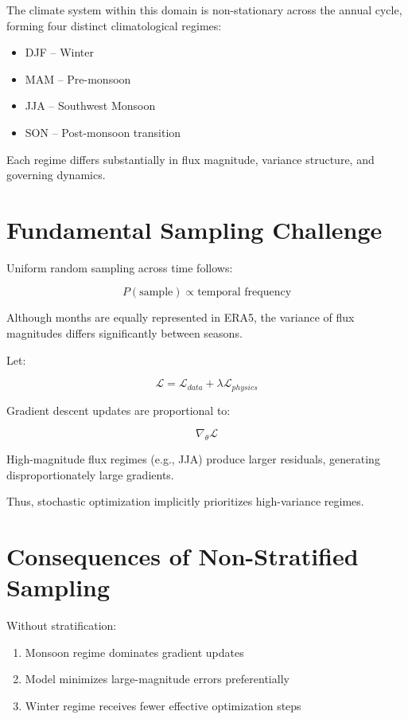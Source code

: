 \documentclass[12pt]{article}
\begin{document}
The climate system within this domain is non-stationary across the annual cycle, forming four distinct climatological regimes:

\begin{itemize}
    \item DJF – Winter
    \item MAM – Pre-monsoon
    \item JJA – Southwest Monsoon
    \item SON – Post-monsoon transition
\end{itemize}

Each regime differs substantially in flux magnitude, variance structure, and governing dynamics.

\section{Fundamental Sampling Challenge}

Uniform random sampling across time follows:

\[
P(\text{sample}) \propto \text{temporal frequency}
\]

Although months are equally represented in ERA5, the variance of flux magnitudes differs significantly between seasons.

Let:

\[
\mathcal{L} = \mathcal{L}_{data} + \lambda \mathcal{L}_{physics}
\]

Gradient descent updates are proportional to:

\[
\nabla_\theta \mathcal{L}
\]

High-magnitude flux regimes (e.g., JJA) produce larger residuals, generating disproportionately large gradients.

Thus, stochastic optimization implicitly prioritizes high-variance regimes.

\section{Consequences of Non-Stratified Sampling}

Without stratification:

\begin{enumerate}[label=(\alph*)]
    \item Monsoon regime dominates gradient updates
    \item Model minimizes large-magnitude errors preferentially
    \item Winter regime receives fewer effective optimization steps
\end{enumerate}
\end{document}
